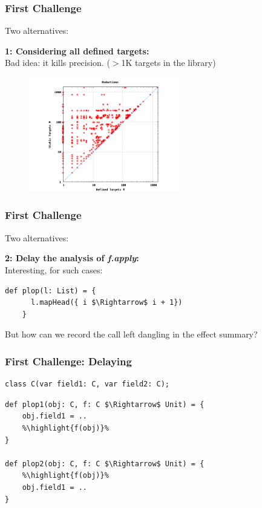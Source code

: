 \documentclass[hyperref={pdfpagelabels=false}]{beamer}
\newcommand\highlight[1]{\color{red}{#1}}
\begin{document}
\begin{frame}[fragile]
\frametitle{First Challenge}
    Two alternatives: 
    \vspace{15pt}

    \textbf{1: Considering all defined targets:}\\
    \vspace{5pt}
    Bad idea: it kills precision. ($>$1K targets in the library)

    \begin{figure}[t]
        \includegraphics[height=50mm]{../../report-2012/images/scatter.png}\\
    \end{figure}

\end{frame}

\begin{frame}[fragile]
\frametitle{First Challenge}
    Two alternatives:
    \vspace{15pt}

    \textbf{2: Delay the analysis of \emph{f.apply}:}\\
    \vspace{5pt}
    Interesting, for such cases:

\begin{lstlisting}[escapechar=\%]
    def plop(l: List) = {
      l.mapHead({ i $\Rightarrow$ i + 1})
    }
\end{lstlisting}

 But how can we record the call left dangling in the effect summary?
\end{frame}

\begin{frame}[fragile]
\frametitle{First Challenge: Delaying}
\begin{lstlisting}[escapechar=\%]
class C(var field1: C, var field2: C);
\end{lstlisting}

\begin{lstlisting}[escapechar=\%]
def plop1(obj: C, f: C $\Rightarrow$ Unit) = {
    obj.field1 = ..
    %\highlight{f(obj)}%
}

def plop2(obj: C, f: C $\Rightarrow$ Unit) = {
    %\highlight{f(obj)}%
    obj.field1 = ..
}
\end{lstlisting}
    \begin{figure}
    \end{figure}
\end{frame}
\end{document}
